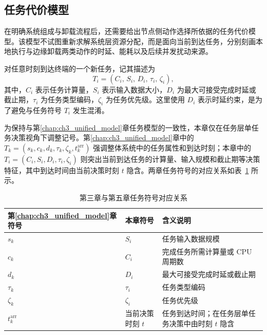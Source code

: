 \subsection{任务代价模型}

在明确系统组成与卸载流程后，还需要给出节点侧动作选择所依据的任务代价模型。该模型不试图重新求解系统层资源分配，而是面向当前到达任务，分别刻画本地执行与边缘卸载两类动作的时延、能耗以及后续并发扰动来源。

对任意时刻到达终端的一个新任务，记其描述为
\begin{equation}
    T_i = \left(C_i,\, S_i,\, D_i,\, \tau_i,\, \zeta_i \right),
    \label{eq:ch5_task_tuple}
\end{equation}
其中，$C_i$ 表示任务计算量，$S_i$ 表示输入数据大小，$D_i$ 为最大可接受完成时延或截止期，$\tau_i$ 为任务类型编码，$\zeta_i$ 为任务优先级。这里使用 $D_i$ 表示时延约束，是为了避免与任务符号 $T_i$ 发生混淆。

为保持与第\ref{chap:ch3_unified_model}章任务模型的一致性，本章仅在任务层单任务决策视角下调整记号。第\ref{chap:ch3_unified_model}章中的 $T_k=(s_k,c_k,d_k,\tau_k,\zeta_k,t_k^{\mathrm{arr}})$ 强调整体系统中的任务属性和到达时刻；本章中的 $T_i=(C_i,S_i,D_i,\tau_i,\zeta_i)$ 则突出当前到达任务的计算量、输入规模和截止期等决策特征，其中到达时间由当前决策时刻 $t$ 隐含。两章任务符号的对应关系如表~\ref{tab:ch5_task_symbol_mapping} 所示。

\begin{table}[H]
    \centering
    \caption{第三章与第五章任务符号对应关系}
    \label{tab:ch5_task_symbol_mapping}
    \begin{tabular}{p{3.0cm}p{3.0cm}p{5.5cm}}
        \toprule
        第\ref{chap:ch3_unified_model}章符号 & 本章符号       & 含义说明                        \\
        \midrule
        $s_k$                            & $S_i$      & 任务输入数据规模                    \\
        $c_k$                            & $C_i$      & 完成任务所需计算量或 CPU 周期数          \\
        $d_k$                            & $D_i$      & 最大可接受完成时延或截止期               \\
        $\tau_k$                         & $\tau_i$   & 任务类型编码                      \\
        $\zeta_k$                        & $\zeta_i$  & 任务优先级                       \\
        $t_k^{\mathrm{arr}}$             & 当前决策时刻 $t$ & 任务到达时间；在任务层单任务决策中由时刻 $t$ 隐含 \\
        \bottomrule
    \end{tabular}
\end{table}

